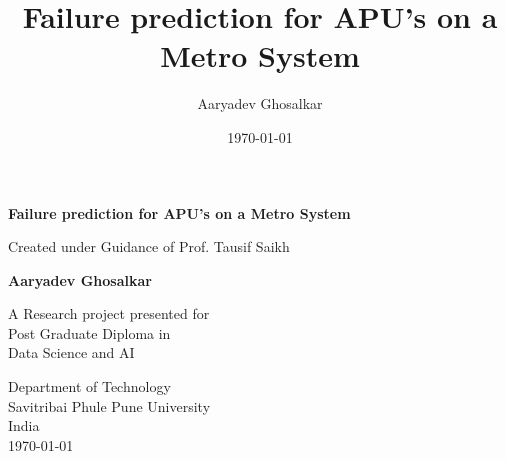 \documentclass{article}
\title{Failure prediction for APU's on a Metro System}
\author{Aaryadev Ghosalkar}
\date{\today}
\begin{document}
\begin{titlepage}
    \begin{center}
        \vspace*{1cm}
            
        \Huge
        \textbf{Failure prediction for APU's on a Metro System}
            
        \vspace{0.5cm}
        \LARGE
        Created under Guidance of Prof. Tausif Saikh
            
        \vspace{1.5cm}
            
        \textbf{Aaryadev Ghosalkar}
            
        \vfill
            
        A Research project presented for \\
        Post Graduate Diploma in\\
        Data Science and AI
            
        \vspace{0.8cm}
            
        \Large
        Department of Technology\\
        Savitribai Phule Pune University\\
        India\\
        \today
            
    \end{center}
\end{titlepage}


\maketitle
\end{document}
